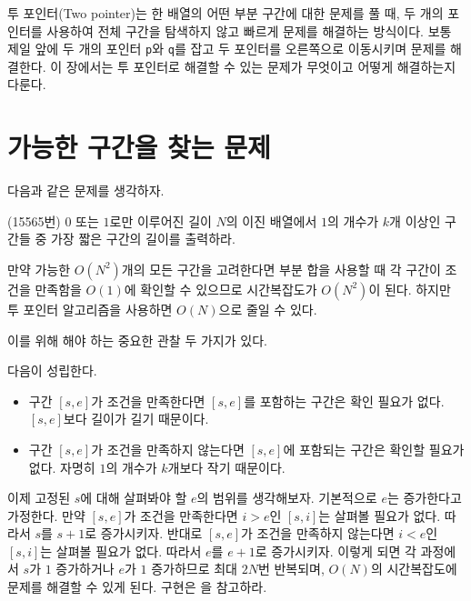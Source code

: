 투 포인터(Two pointer)는 한 배열의 어떤 부분 구간에 대한 문제를 풀 때, 두 개의 포인터를 사용하여 전체 구간을 탐색하지 않고 빠르게 문제를 해결하는 방식이다. 보통 제일 앞에 두 개의 포인터 \texttt{p}와 \texttt{q}를 잡고 두 포인터를 오른쪽으로 이동시키며 문제를 해결한다. 이 장에서는 투 포인터로 해결할 수 있는 문제가 무엇이고 어떻게 해결하는지 다룬다.

\section{가능한 구간을 찾는 문제}
다음과 같은 문제를 생각하자.

\begin{example} \label{ex: two-pointer}
    (15565번) $0$ 또는 $1$로만 이루어진 길이 $N$의 이진 배열에서 $1$의 개수가 $k$개 이상인 구간들 중 가장 짧은 구간의 길이를 출력하라.
\end{example}

만약 가능한 $O(N^2)$개의 모든 구간을 고려한다면 부분 합을 사용할 때 각 구간이 조건을 만족함을 $O(1)$에 확인할 수 있으므로 시간복잡도가 $O(N^2)$이 된다. 하지만 투 포인터 알고리즘을 사용하면 $O(N)$으로 줄일 수 있다.

이를 위해 해야 하는 중요한 관찰 두 가지가 있다.
\begin{obs}
    다음이 성립한다.
    \begin{itemize}
        \item 구간 $[s, e]$가 조건을 만족한다면 $[s, e]$를 포함하는 구간은 확인 필요가 없다. $[s, e]$보다 길이가 길기 때문이다.
        \item 구간 $[s, e]$가 조건을 만족하지 않는다면 $[s, e]$에 포함되는 구간은 확인할 필요가 없다. 자명히 $1$의 개수가 $k$개보다 작기 때문이다.
    \end{itemize}
\end{obs}
이제 고정된 $s$에 대해 살펴봐야 할 $e$의 범위를 생각해보자. 기본적으로 $e$는 증가한다고 가정한다. 만약 $[s, e]$가 조건을 만족한다면 $i>e$인 $[s, i]$는 살펴볼 필요가 없다. 따라서 $s$를 $s+1$로 증가시키자. 반대로 $[s, e]$가 조건을 만족하지 않는다면 $i<e$인 $[s, i]$는 살펴볼 필요가 없다. 따라서 $e$를 $e+1$로 증가시키자. 이렇게 되면 각 과정에서 $s$가 $1$ 증가하거나 $e$가 $1$ 증가하므로 최대 $2N$번 반복되며, $O(N)$의 시간복잡도에 문제를 해결할 수 있게 된다. 구현은 을 참고하라.

